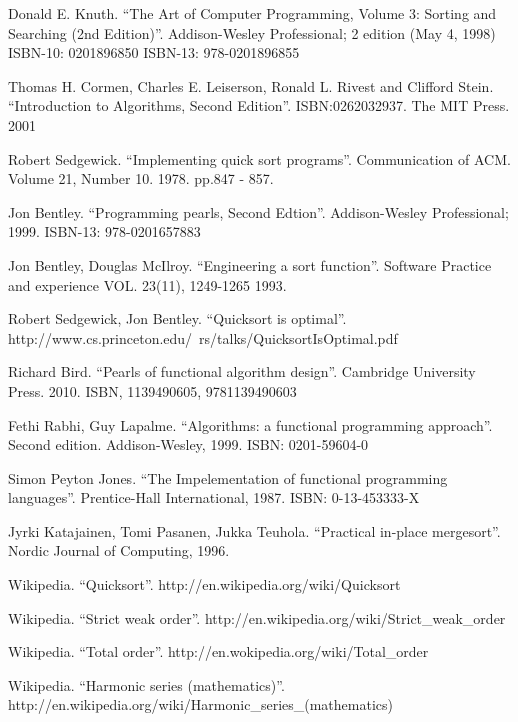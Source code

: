 \documentclass{article}
\begin{document}
\begin{thebibliography}{99}

Donald E. Knuth. ``The Art of Computer Programming, Volume 3: Sorting and Searching (2nd Edition)''. Addison-Wesley Professional; 2 edition (May 4, 1998) ISBN-10: 0201896850 ISBN-13: 978-0201896855

Thomas H. Cormen, Charles E. Leiserson, Ronald L. Rivest and Clifford Stein. 
``Introduction to Algorithms, Second Edition''. ISBN:0262032937. The MIT Press. 2001

Robert Sedgewick. ``Implementing quick sort programs''. Communication of ACM. Volume 21, Number 10. 1978. pp.847 - 857.

Jon Bentley. ``Programming pearls, Second Edtion''. Addison-Wesley Professional; 1999. ISBN-13: 978-0201657883

Jon Bentley, Douglas McIlroy. ``Engineering a sort function''. Software Practice and experience VOL. 23(11), 1249-1265 1993.

Robert Sedgewick, Jon Bentley. ``Quicksort is optimal''. http://www.cs.princeton.edu/~rs/talks/QuicksortIsOptimal.pdf

Richard Bird. ``Pearls of functional algorithm design''. Cambridge University Press. 2010. ISBN, 1139490605, 9781139490603

Fethi Rabhi, Guy Lapalme. ``Algorithms: a functional programming approach''. Second edition. Addison-Wesley, 1999. ISBN: 0201-59604-0

Simon Peyton Jones. ``The Impelementation of functional programming languages''. Prentice-Hall International, 1987. ISBN: 0-13-453333-X

Jyrki Katajainen, Tomi Pasanen, Jukka Teuhola. ``Practical in-place mergesort''. Nordic Journal of Computing, 1996.

Wikipedia. ``Quicksort''. http://en.wikipedia.org/wiki/Quicksort

Wikipedia. ``Strict weak order''. http://en.wikipedia.org/wiki/Strict\_weak\_order

Wikipedia. ``Total order''. http://en.wokipedia.org/wiki/Total\_order

Wikipedia. ``Harmonic series (mathematics)''. http://en.wikipedia.org/wiki/Harmonic\_series\_(mathematics)

\end{thebibliography}

\ifx\wholebook\relax\else
\end{document}
